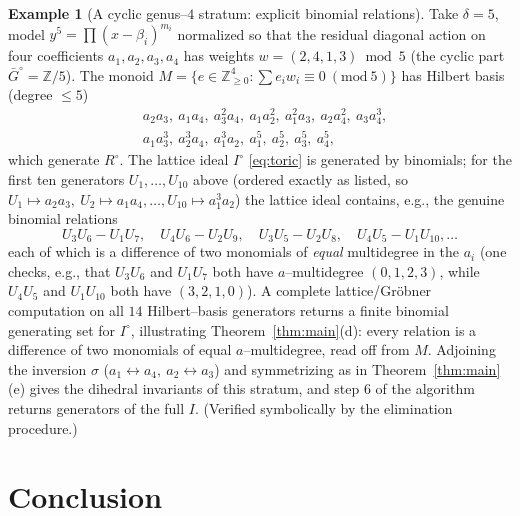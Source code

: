\documentclass{amsart}
\theoremstyle{definition}
\newtheorem{example}[theorem]{Example}
\begin{document}
\begin{example}[A cyclic genus--$4$ stratum: explicit binomial relations]\label{ex:cyclic}
Take $\delta=5$, model $y^5=\prod(x-\beta_i)^{m_i}$ normalized so that the residual
diagonal action on four coefficients $a_1,a_2,a_3,a_4$ has weights
$w=(2,4,1,3)\bmod 5$ (the cyclic part $\bar G^{\circ}=\mathbb{Z}/5$). The monoid
$M=\{e\in\mathbb{Z}_{\ge0}^4:\sum e_iw_i\equiv0\ (\mathrm{mod}\ 5)\}$ has Hilbert
basis (degree $\le 5$)
\[
\begin{aligned}
&a_2a_3,\ a_1a_4,\ a_3^2a_4,\ a_1a_2^2,\ a_1^2a_3,\ a_2a_4^2,\ a_3a_4^3,\\
&a_1a_3^3,\ a_2^3a_4,\ a_1^3a_2,\ a_1^5,\ a_2^5,\ a_3^5,\ a_4^5 ,
\end{aligned}
\]
which generate $R^{\circ}$. The lattice ideal $I^{\circ}$ \eqref{eq:toric} is
generated by binomials; for the first ten generators
$U_1,\dots,U_{10}$ above (ordered exactly as listed, so $U_1\mapsto a_2a_3,\
U_2\mapsto a_1a_4,\dots,U_{10}\mapsto a_1^3a_2$) the lattice ideal contains, e.g.,
the genuine binomial relations
\[
 U_3U_6-U_1U_7,\quad U_4U_6-U_2U_9,\quad U_3U_5-U_2U_8,\quad U_4U_5-U_1U_{10},\dots
\]
each of which is a difference of two monomials of \emph{equal} multidegree in the
$a_i$ (one checks, e.g., that $U_3U_6$ and $U_1U_7$ both have $a$--multidegree
$(0,1,2,3)$, while $U_4U_5$ and $U_1U_{10}$ both have $(3,2,1,0)$). A complete
lattice/Gr\"obner computation on all $14$ Hilbert--basis generators returns a finite
binomial generating set for $I^{\circ}$, illustrating Theorem~\ref{thm:main}(d):
every relation is a difference of two monomials of equal $a$--multidegree, read off
from $M$. Adjoining the inversion $\sigma$
($a_1\!\leftrightarrow\!a_4,\ a_2\!\leftrightarrow\!a_3$) and symmetrizing as in
Theorem~\ref{thm:main}(e) gives the dihedral invariants of this stratum, and step 6
of the algorithm returns generators of the full $I$. (Verified symbolically by the
elimination procedure.)
\end{example}

\section{Conclusion}
\end{document}
